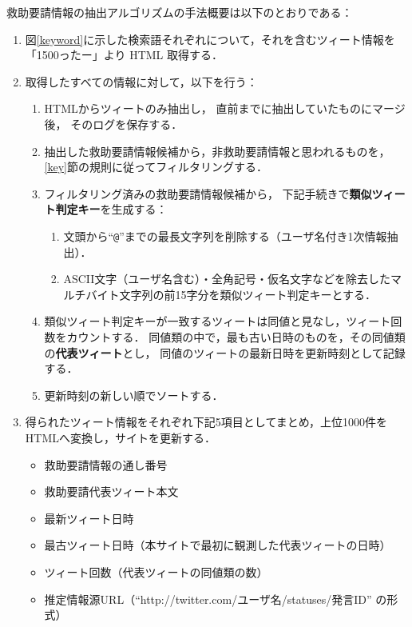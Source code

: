 \documentclass[japanese]{jnlp_1.4}
\begin{document}
救助要請情報の抽出アルゴリズムの手法概要は以下のとおりである：
\begin{enumerate}
\item 
  図\ref{keyword}に示した検索語それぞれについて，それを含むツィート情報を
  「1500ったー」\cite{1500}より HTML 取得する．
\item 取得したすべての情報に対して，以下を行う：
  \begin{enumerate}
  \item HTMLからツィートのみ抽出し，
    直前までに抽出していたものにマージ後，
    そのログを保存する．
  \item 
    抽出した救助要請情報候補から，非救助要請情報と思われるものを，\ref{key}節の規則に従ってフィルタリングする．
  \item フィルタリング済みの救助要請情報候補から，
    下記手続きで{\bf 類似ツィート判定キー}を生成する：
    \begin{enumerate}
    \item 文頭から``{\tt @}''までの最長文字列を削除する（ユーザ名付き1次情報抽出）．
    \item ASCII文字（ユーザ名含む）・全角記号・仮名文字などを除去したマルチバイト文字列の前15字分を類似ツィート判定キーとする．
    \end{enumerate}
  \item 
    類似ツィート判定キーが一致するツィートは同値と見なし，ツィート回数をカウントする．
    同値類の中で，最も古い日時のものを，その同値類の{\bf 代表ツィート}とし，
    同値のツィートの最新日時を更新時刻として記録する．
  \item 更新時刻の新しい順でソートする．
  \end{enumerate}
\item 
  得られたツィート情報をそれぞれ下記5項目としてまとめ，上位1000件をHTMLへ変換し，サイトを更新する．
  \begin{itemize}
  \item 救助要請情報の通し番号
  \item 救助要請代表ツィート本文
  \item 最新ツィート日時
  \item 最古ツィート日時（本サイトで最初に観測した代表ツィートの日時）
  \item ツィート回数（代表ツィートの同値類の数）
  \item 推定情報源URL（``http://twitter.com/ユーザ名/statuses/発言ID'' の形式）
  \end{itemize}                                             
\end{enumerate}
\end{document}
